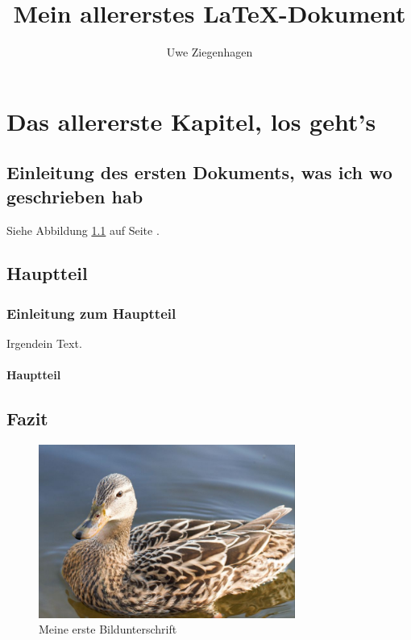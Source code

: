 \documentclass[15pt,ngerman]{scrreprt}
\author{Uwe Ziegenhagen}
\title{Mein allererstes \LaTeX-Dokument}
\begin{document}
\maketitle

\tableofcontents

\listoffigures

\chapter{Das allererste Kapitel, los geht's}

\section{Einleitung des ersten Dokuments, was ich wo geschrieben hab}

\blindtext

Siehe Abbildung \ref{fig:ente} auf Seite \pageref{fig:ente}.

\section{Hauptteil}

\subsection{Einleitung zum Hauptteil}

Irgendein Text.

\subsubsection{Hauptteil}


\blindtext[2]

\blindtext[2]


\section{Fazit}

\begin{figure}[h]
	\begin{center}
		\includegraphics[width=0.75\textwidth]{./Bilder/image1}
	\caption{Meine erste Bildunterschrift}\label{fig:ente}
	\end{center}
\end{figure}
\end{document}
